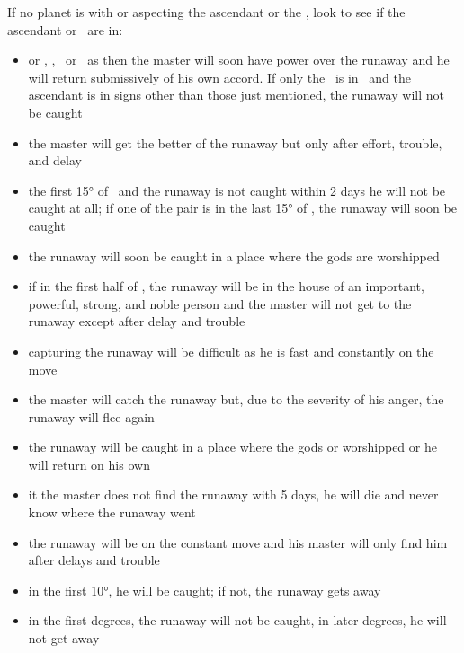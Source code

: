 If no planet is with or aspecting the ascendant or the \Moon, look to see if the ascendant or \Moon\, are in:
\begin{itemize}[topsep=0em,itemsep=0em]
\item[\Aries] or \Gemini, \Leo, \Sagittarius\, or \Pisces\, as then the master will soon have power over the runaway and he will return submissively of his own accord. If only the \Moon\, is in \Aries\, and the ascendant is in signs other than those just mentioned, the runaway will not be caught

\item[\Taurus] the master will get the better of the runaway but only after effort, trouble, and delay

\item[\Gemini] the first 15° of \Gemini\, and the runaway is not caught within 2 days he will not be caught at all; if one of the pair is in the last 15° of \Gemini, the runaway will soon be caught

\item[\Cancer] the runaway will soon be caught in a place where the gods are worshipped

\item[\Leo] if in the first half of \Leo, the runaway will be in the house of an important, powerful, strong, and noble person and the master will not get to the runaway except after delay and trouble

\item[\Virgo] capturing the runaway will be difficult as he is fast and constantly on the move

\item[\Libra] the master will catch the runaway but, due to the severity of his anger, the runaway will flee again

\item[\Scorpio] the runaway will be caught in a place where the gods or worshipped or he will return on his own

\item[\Sagittarius]  it the master does not find the runaway with 5 days, he will die and never know where the runaway went

\item[\Capricorn] the runaway will be on the constant move and his master will only find him after delays and trouble

\item[\Aquarius] in the first 10°, he will be caught; if not, the runaway gets away

\item[\Pisces] in the first degrees, the runaway will not be caught, in later degrees, he will not get away
\end{itemize}

